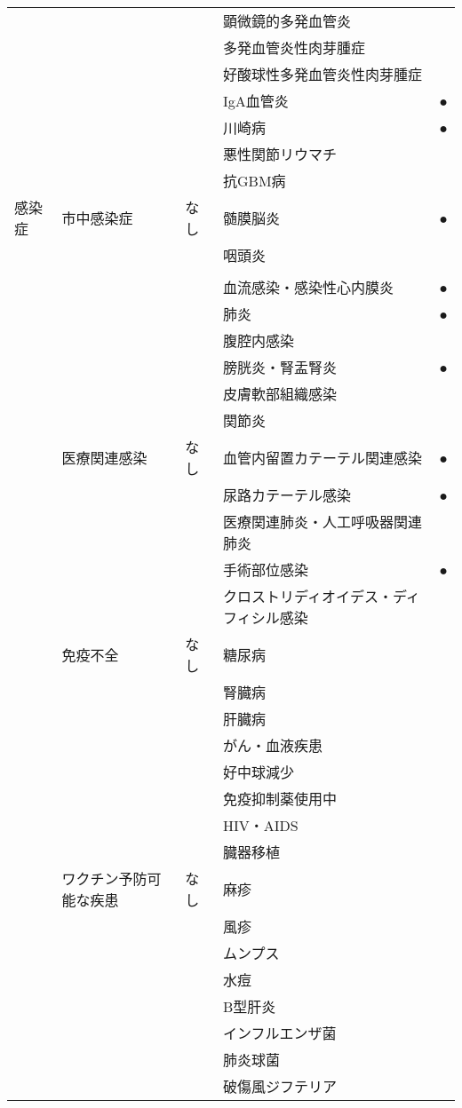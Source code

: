 \begin{xltabular}{\linewidth}{XXXXX}
 &  &  & 顕微鏡的多発血管炎 &  \\
 &  &  & 多発血管炎性肉芽腫症 &  \\
 &  &  & 好酸球性多発血管炎性肉芽腫症 &  \\
 &  &  & IgA血管炎 & ● \\
 &  &  & 川崎病 & ● \\
 &  &  & 悪性関節リウマチ &  \\
 &  &  & 抗GBM病 &  \\
感染症 & 市中感染症 & なし & 髄膜脳炎 & ● \\
 &  &  & 咽頭炎 &  \\
 &  &  &  &  \\
 &  &  & 血流感染・感染性心内膜炎 & ● \\
 &  &  & 肺炎 & ● \\
 &  &  & 腹腔内感染 &  \\
 &  &  & 膀胱炎・腎盂腎炎 & ● \\
 &  &  & 皮膚軟部組織感染 &  \\
 &  &  & 関節炎 &  \\
 & 医療関連感染 & なし & 血管内留置カテーテル関連感染 & ● \\
 &  &  & 尿路カテーテル感染 & ● \\
 &  &  & 医療関連肺炎・人工呼吸器関連肺炎 &  \\
 &  &  & 手術部位感染 & ● \\
 &  &  & クロストリディオイデス・ディフィシル感染 &  \\
 & 免疫不全 & なし & 糖尿病 &  \\
 &  &  & 腎臓病 &  \\
 &  &  & 肝臓病 &  \\
 &  &  & がん・血液疾患 &  \\
 &  &  & 好中球減少 &  \\
 &  &  & 免疫抑制薬使用中 &  \\
 &  &  & HIV・AIDS &  \\
 &  &  & 臓器移植 &  \\
 & ワクチン予防可能な疾患 & なし & 麻疹 &  \\
 &  &  & 風疹 &  \\
 &  &  & ムンプス &  \\
 &  &  & 水痘 &  \\
 &  &  & B型肝炎 &  \\
 &  &  & インフルエンザ菌 &  \\
 &  &  & 肺炎球菌 &  \\
 &  &  & 破傷風ジフテリア &  \\

\end{xltabular}
